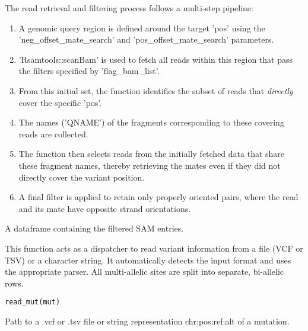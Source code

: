 \documentclass[a4paper]{book}
\begin{document}
\begin{Details}
The read retrieval and filtering process follows a multi-step pipeline:
\begin{enumerate}

\item{} A genomic query region is defined around the target 'pos' using the 'neg\_offset\_mate\_search' and 'pos\_offset\_mate\_search' parameters.
\item{} 'Rsamtools::scanBam' is used to fetch all reads within this region that pass the filters specified by 'flag\_bam\_list'.
\item{} From this initial set, the function identifies the subset of reads that \emph{directly} cover the specific 'pos'.
\item{} The names ('QNAME') of the fragments corresponding to these covering reads are collected.
\item{} The function then selects  reads from the initially fetched data that share these fragment names, thereby
retrieving the mates even if they did not directly cover the variant position.
\item{} A final filter is applied to retain only properly oriented pairs, where the read and its mate have opposite strand orientations.

\end{enumerate}

\end{Details}
%
\begin{Value}
A dataframe containing the filtered SAM entries.
\end{Value}
%
\begin{Description}
This function acts as a dispatcher to read variant information from a file (VCF or TSV) or a character
string. It automatically detects the input format and uses the appropriate parser. All multi-allelic sites are split
into separate, bi-allelic rows.
\end{Description}
%
\begin{Usage}
\begin{verbatim}
read_mut(mut)
\end{verbatim}
\end{Usage}
%
\begin{Arguments}
\begin{ldescription}
\item[\code{mut}] Path to a .vcf or .tsv file or string representation chr:pos:ref:alt of a mutation.
\end{ldescription}
\end{Arguments}
\end{document}
